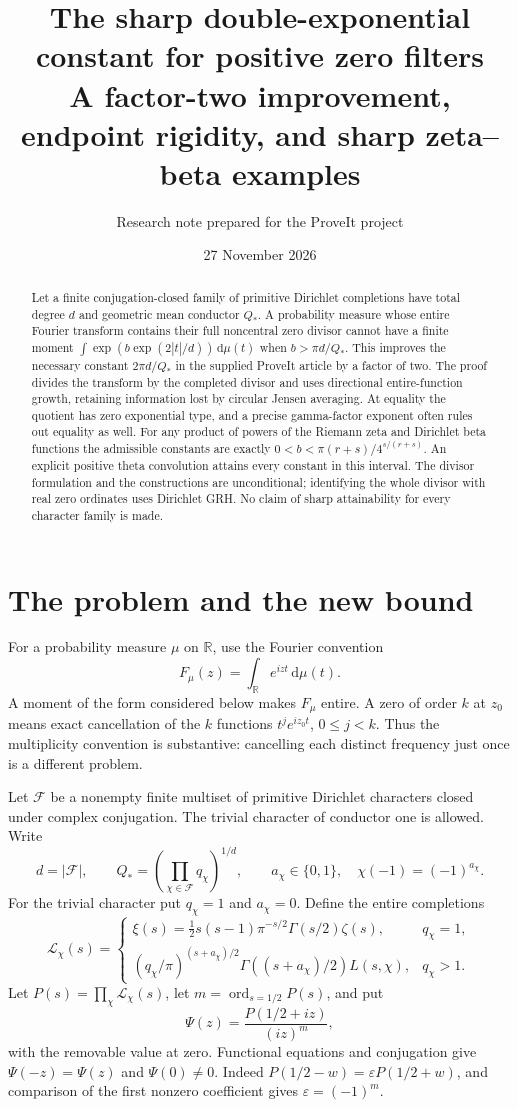 \documentclass[11pt]{article}
\title{\textbf{The sharp double-exponential constant for positive zero filters}\\[5pt]\large A factor-two improvement, endpoint rigidity, and sharp zeta--beta examples}
\author{Research note prepared for the ProveIt project}
\date{27 November 2026}
\theoremstyle{remark}\newtheorem{remark}[theorem]{Remark}
\newcommand{\R}{\mathbb R}\newcommand{\C}{\mathbb C}
\newcommand{\dd}{\,\mathrm d}
\newcommand{\ord}{\operatorname{ord}}
\begin{document}
\maketitle
\begin{abstract}
Let a finite conjugation-closed family of primitive Dirichlet completions have total degree $d$ and geometric mean conductor $Q_*$. A probability measure whose entire Fourier transform contains their full noncentral zero divisor cannot have a finite moment $\int\exp(b\exp(2|t|/d))\dd\mu(t)$ when $b>\pi d/Q_*$. This improves the necessary constant $2\pi d/Q_*$ in the supplied ProveIt article by a factor of two. The proof divides the transform by the completed divisor and uses directional entire-function growth, retaining information lost by circular Jensen averaging. At equality the quotient has zero exponential type, and a precise gamma-factor exponent often rules out equality as well. For any product of powers of the Riemann zeta and Dirichlet beta functions the admissible constants are exactly $0<b<\pi(r+s)/4^{s/(r+s)}$. An explicit positive theta convolution attains every constant in this interval. The divisor formulation and the constructions are unconditional; identifying the whole divisor with real zero ordinates uses Dirichlet GRH. No claim of sharp attainability for every character family is made.
\end{abstract}

\section{The problem and the new bound}

For a probability measure $\mu$ on $\R$, use the Fourier convention
\[
 F_\mu(z)=\int_\R e^{izt}\dd\mu(t).
\]
A moment of the form considered below makes $F_\mu$ entire. A zero of order $k$ at $z_0$ means exact cancellation of the $k$ functions $t^j e^{iz_0t}$, $0\le j<k$. Thus the multiplicity convention is substantive: cancelling each distinct frequency just once is a different problem.

Let $\mathcal F$ be a nonempty finite multiset of primitive Dirichlet characters closed under complex conjugation. The trivial character of conductor one is allowed. Write
\[
 d=|\mathcal F|,\qquad Q_* =\left(\prod_{\chi\in\mathcal F}q_\chi\right)^{1/d},
 \qquad a_\chi\in\{0,1\},\quad \chi(-1)=(-1)^{a_\chi}.
\]
For the trivial character put $q_\chi=1$ and $a_\chi=0$. Define the entire completions
\[
 \mathcal L_\chi(s)=
 \begin{cases}
 \xi(s)=\frac12s(s-1)\pi^{-s/2}\Gamma(s/2)\zeta(s),&q_\chi=1,\\
 (q_\chi/\pi)^{(s+a_\chi)/2}\Gamma((s+a_\chi)/2)L(s,\chi),&q_\chi>1.
 \end{cases}
\]
Let $P(s)=\prod_\chi\mathcal L_\chi(s)$, let $m=\ord_{s=1/2}P(s)$, and put
\begin{equation}\label{eq:Psi}
 \Psi(z)=\frac{P(1/2+iz)}{(iz)^m},
\end{equation}
with the removable value at zero. Functional equations and conjugation give $\Psi(-z)=\Psi(z)$ and $\Psi(0)\ne0$. Indeed $P(1/2-w)=\varepsilon P(1/2+w)$, and comparison of the first nonzero coefficient gives $\varepsilon=(-1)^m$.
\end{document}
